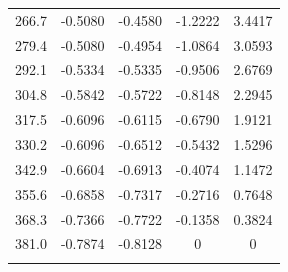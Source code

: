 \documentclass[12pt]{article}
\begin{document}
\begin{center}
\begin{tabular}{ccccc}
266.7                & -0.5080              & -0.4580              & -1.2222              & 3.4417               \\
279.4                & -0.5080              & -0.4954              & -1.0864              & 3.0593               \\
292.1                & -0.5334              & -0.5335              & -0.9506              & 2.6769               \\
304.8                & -0.5842              & -0.5722              & -0.8148              & 2.2945               \\
317.5                & -0.6096              & -0.6115              & -0.6790              & 1.9121               \\
330.2                & -0.6096              & -0.6512              & -0.5432              & 1.5296               \\
342.9                & -0.6604              & -0.6913              & -0.4074              & 1.1472               \\
355.6                & -0.6858              & -0.7317              & -0.2716              & 0.7648               \\
368.3                & -0.7366              & -0.7722              & -0.1358              & 0.3824               \\
381.0                & -0.7874              & -0.8128              & 0                    & 0                    \\
\hline
\multicolumn{1}{l}{} & \multicolumn{1}{l}{} & \multicolumn{1}{l}{} & \multicolumn{1}{l}{} & \multicolumn{1}{l}{}
\end{tabular}
\end{center}

\newpage
\end{document}
